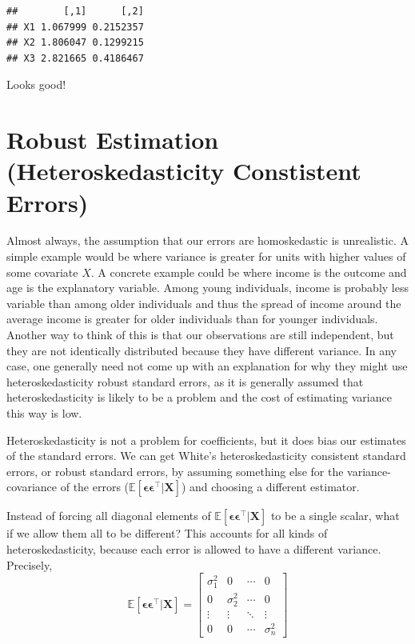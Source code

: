 \documentclass[]{article}
\begin{document}
\begin{verbatim}
##        [,1]      [,2]
## X1 1.067999 0.2152357
## X2 1.806047 0.1299215
## X3 2.821665 0.4186467
\end{verbatim}

Looks good!

\hypertarget{robust-estimation-heteroskedasticity-constistent-errors}{%
\section{Robust Estimation (Heteroskedasticity Constistent
Errors)}\label{robust-estimation-heteroskedasticity-constistent-errors}}

Almost always, the assumption that our errors are homoskedastic is
unrealistic. A simple example would be where variance is greater for
units with higher values of some covariate \(X\). A concrete example
could be where income is the outcome and age is the explanatory
variable. Among young individuals, income is probably less variable than
among older individuals and thus the spread of income around the average
income is greater for older individuals than for younger individuals.
Another way to think of this is that our observations are still
independent, but they are not identically distributed because they have
different variance. In any case, one generally need not come up with an
explanation for why they might use heteroskedasticity robust standard
errors, as it is generally assumed that heteroskedasticity is likely to
be a problem and the cost of estimating variance this way is low.

Heteroskedasticity is not a problem for coefficients, but it does bias
our estimates of the standard errors. We can get White's
heteroskedasticity consistent standard errors, or robust standard
errors, by assuming something else for the variance-covariance of the
errors (\(\mathbb{E}[\bm{\epsilon}\bm{\epsilon}^\top |\mathbf{X}]\)) and
choosing a different estimator.

Instead of forcing all diagonal elements of
\(\mathbb{E}[\bm{\epsilon}\bm{\epsilon}^\top |\mathbf{X}]\) to be a
single scalar, what if we allow them all to be different? This accounts
for all kinds of heteroskedasticity, because each error is allowed to
have a different variance. Precisely,
\[\mathbb{E}[\bm{\epsilon}\bm{\epsilon}^\top |\mathbf{X}] = \begin{bmatrix}
\sigma_1^2 & 0 & \cdots & 0 \\
0 & \sigma_2^2 & \cdots & 0 \\
\vdots & \vdots & \ddots & \vdots \\
0 & 0 & \cdots & \sigma_n^2
\end{bmatrix}\]
\end{document}
